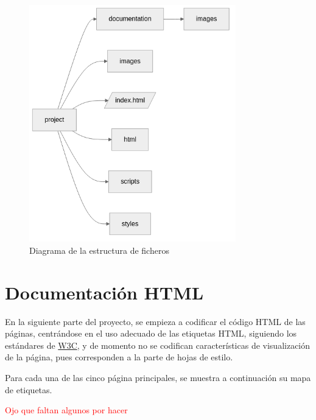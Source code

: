 \documentclass[11pt, a4paper]{book}
\begin{document}
	\begin{figure} [H]
		\centering
		\includegraphics[width=0.8\textwidth]{estructura_ficheros.png}
		\caption{Diagrama de la estructura de ficheros}
	\end{figure}
	
	
	
	
	
	
	
	
	
	
	\chapter{Documentación HTML}
	
	En la siguiente parte del proyecto, se empieza a codificar el código HTML de las páginas, centrándose en el uso adecuado de las etiquetas HTML, siguiendo los estándares de \href{https://html.spec.whatwg.org/multipage/}{W3C}, y de momento no se codifican características de visualización de la página, pues corresponden a la parte de hojas de estilo. 
	
	Para cada una de las cinco página principales, se muestra a continuación su mapa de etiquetas.
	
	\begin{Huge}
		\textcolor{red}{Ojo que faltan algunos por hacer}
	\end{Huge}
	
\end{document}
